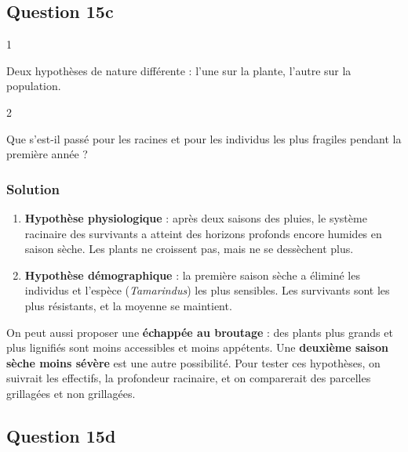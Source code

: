 \documentclass[11pt,a4paper]{article}
\providecommand{\tightlist}{\setlength{\itemsep}{0pt}\setlength{\parskip}{0pt}}
\begin{document}
\hypertarget{question-15c}{%
\subsection{Question 15c}\label{question-15c}}

\begin{indication}{1}

Deux hypothèses de nature différente : l'une sur la plante, l'autre sur la population.

\end{indication}

\begin{indication}{2}

Que s'est-il passé pour les racines et pour les individus les plus fragiles pendant la première année ?

\end{indication}

\hypertarget{solution-43}{%
\subsubsection{Solution}\label{solution-43}}

\begin{enumerate}
\def\labelenumi{\arabic{enumi}.}
\tightlist
\item
  \textbf{Hypothèse physiologique} : après deux saisons des pluies, le système racinaire des survivants a atteint des horizons profonds encore humides en saison sèche. Les plants ne croissent pas, mais ne se dessèchent plus.
\item
  \textbf{Hypothèse démographique} : la première saison sèche a éliminé les individus et l'espèce (\emph{Tamarindus}) les plus sensibles. Les survivants sont les plus résistants, et la moyenne se maintient.
\end{enumerate}

On peut aussi proposer une \textbf{échappée au broutage} : des plants plus grands et plus lignifiés sont moins accessibles et moins appétents. Une \textbf{deuxième saison sèche moins sévère} est une autre possibilité. Pour tester ces hypothèses, on suivrait les effectifs, la profondeur racinaire, et on comparerait des parcelles grillagées et non grillagées.

\hypertarget{question-15d}{%
\subsection{Question 15d}\label{question-15d}}
\end{document}

